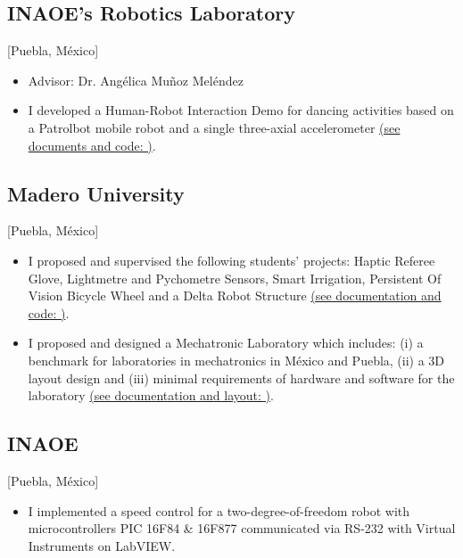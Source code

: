 \documentclass{mycv}
\begin{document}
\subsection{INAOE's Robotics Laboratory}[Puebla, M\'exico]
\begin{positions}
\end{positions}
\begin{itemize}
  \item Advisor: Dr. Ang\'elica Mu\~noz Mel\'endez
  \item I developed a Human-Robot Interaction Demo for dancing activities based on 
a Patrolbot mobile robot and a single three-axial accelerometer 
\href{https://sites.google.com/site/perezxochicale/projects/demodance}{(see documents and code: \faExternalLink)}.
\end{itemize}

\subsection{Madero University}[Puebla, M\'exico]
\begin{positions}
\end{positions}
\begin{itemize}
	\item I proposed and supervised the following students' projects: Haptic Referee Glove,
	Lightmetre and Pychometre Sensors, Smart Irrigation, Persistent Of Vision Bicycle Wheel
	and a Delta Robot Structure 
	\href{https://sites.google.com/site/perezxochicaleprojects/studentprojects}{(see documentation and code: \faExternalLink)}.
	\item I proposed and designed a Mechatronic Laboratory which includes: 
	(i) a benchmark for laboratories in mechatronics in M\'exico and Puebla, 
	(ii) a 3D layout design and 
	(iii) minimal requirements of hardware and software for the laboratory
	\href{https://sites.google.com/site/perezxochicaleprojects/mechatronicslaboratorydesign}{(see documentation and layout: \faExternalLink)}.
\end{itemize}

\subsection{INAOE}[Puebla, M\'exico]
\begin{positions}
\end{positions}
\begin{itemize}
  \item  I implemented a speed control for a two-degree-of-freedom robot with microcontrollers
PIC 16F84 \& 16F877 communicated via RS-232 with Virtual Instruments on LabVIEW.
\end{itemize}
\end{document}

